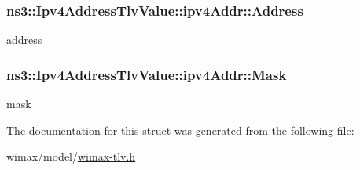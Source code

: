 \subsubsection[{\texorpdfstring{Address}{Address}}]{ ns3\+::\+Ipv4\+Address\+Tlv\+Value\+::ipv4\+Addr\+::\+Address}\hypertarget{structns3_1_1Ipv4AddressTlvValue_1_1ipv4Addr_a536cd63a0fc5101bd67ed6bc6d4d9b08}{}\label{structns3_1_1Ipv4AddressTlvValue_1_1ipv4Addr_a536cd63a0fc5101bd67ed6bc6d4d9b08}


address 

\subsubsection[{\texorpdfstring{Mask}{Mask}}]{ ns3\+::\+Ipv4\+Address\+Tlv\+Value\+::ipv4\+Addr\+::\+Mask}\hypertarget{structns3_1_1Ipv4AddressTlvValue_1_1ipv4Addr_a43cc1d9a8e8d40c69a8aab40a8d2f001}{}\label{structns3_1_1Ipv4AddressTlvValue_1_1ipv4Addr_a43cc1d9a8e8d40c69a8aab40a8d2f001}


mask 



The documentation for this struct was generated from the following file\+:\begin{DoxyCompactItemize}
\item 
wimax/model/\hyperlink{wimax-tlv_8h}{wimax-\/tlv.\+h}\end{DoxyCompactItemize}
